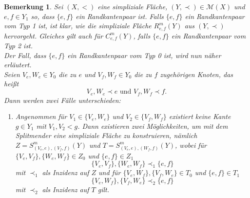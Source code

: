 \documentclass[12pt,titlepage]{article}
\newcommand{\gelb}{0.550000011920929}
\newtheorem{bemerkung}{Bemerkung}[section]
\begin{document}
\begin{bemerkung}
Sei $(X,<)$ eine simpliziale Fläche, $(Y,\prec)\in \mathcal{M}(X)$ und $e,f \in Y_1$ so, dass $\{e,f\}$ ein Randkantenpaar ist.
 Falls $\{e,f\}$ ein Randkantenpaar vom Typ 1 ist, ist klar, wie die simpliziale Fläche $R^m_{e,f}(Y)$ aus $(Y,\prec)$ hervorgeht. Gleiches gilt auch für $C^m_{e,f}(Y)$, falls $\{e,f\}$ ein Randkantenpaar vom Typ 2 ist.\\
Der Fall, dass $\{e,f\}$ ein Randkantenpaar vom Typ 0 ist, wird nun näher erläutert.\\
Seien $V_e,W_e \in Y_0$ die zu $e$ und $V_f,W_f \in Y_0$ die zu $f$ zugehörigen Knoten, das heißt
\[
V_e,W_e \prec e \text{ und } V_f,W_f \prec f.
\]  
Dann werden zwei Fälle unterschieden:
\begin{enumerate}
\item Angenommen für $V_1\in \{V_e,W_e\}$ und $V_2 \in \{V_f,W_f\}$ existiert keine Kante $g \in Y_1$ mit $V_1,V_2 <g$. Dann existieren zwei Möglichkeiten, um mit dem Splitmender eine simpliziale Fläche zu konstruieren, nämlich $Z=S^m_{(V_e,e),(V_f,f)}(Y)$ und $T=S^m_{(V_e,e),(W_f,f)}(Y)$, 
wobei für $\{V_e,V_f\},\{W_e,W_f\} \in Z_0$ und $\{e,f\} \in Z_1$
\[
\{V_e,V_f\},\{W_e,W_f\}\prec_1 \{e,f\}
\] mit $\prec_1$ als Inzidenz auf $Z$ und für $\{V_e, W_f\},\{V_f,W_e\}\in T_0$ und $\{e,f\}\in T_1$
\[
\{V_e,W_f\},\{V_f,W_e\}\prec_2 \{e,f\} 
\]  mit $\prec_2$ als Inzidenz auf $T$ gilt.
 \\
\begin{figure}[H] 
\end{figure}
\end{enumerate}
\end{bemerkung}
\end{document}
